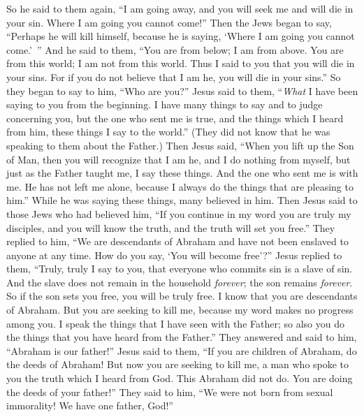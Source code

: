 \begin{biblechapter}
 So he said to them again, “I am going away, and you will seek me and will die in your sin. Where I am going you cannot come!”
\verse Then the Jews began to say, “Perhaps he will kill himself, because he is saying, ‘Where I am going you cannot come.’ ”
\verse And he said to them, “You are from below; I am from above. You are from this world; I am not from this world.
\verse Thus I said to you that you will die in your sins. For if you do not believe that I am he, you will die in your sins.”
\verse So they began to say to him, “Who are you?” Jesus said to them, “\textit{What} I have been saying to you from the beginning.
\verse I have many things to say and to judge concerning you, but the one who sent me is true, and the things which I heard from him, these things I say to the world.”
\verse (They did not know that he was speaking to them about the Father.)
\verse Then Jesus said, “When you lift up the Son of Man, then you will recognize that I am he, and I do nothing from myself, but just as the Father taught me, I say these things.
\verse And the one who sent me is with me. He has not left me alone, because I always do the things that are pleasing to him.”
\verse While he was saying these things, many believed in him.
 Then Jesus said to those Jews who had believed him, “If you continue in my word you are truly my disciples,
\verse and you will know the truth, and the truth will set you free.”
\verse They replied to him, “We are descendants of Abraham and have not been enslaved to anyone at any time. How do you say, ‘You will become free’?”
\verse Jesus replied to them, “Truly, truly I say to you, that everyone who commits sin is a slave of sin.
\verse And the slave does not remain in the household \textit{forever}; the son remains \textit{forever}.
\verse So if the son sets you free, you will be truly free.
\verse I know that you are descendants of Abraham. But you are seeking to kill me, because my word makes no progress among you.
\verse I speak the things that I have seen with the Father; so also you do the things that you have heard from the Father.”
 They answered and said to him, “Abraham is our father!” Jesus said to them, “If you are children of Abraham, do the deeds of Abraham!
\verse But now you are seeking to kill me, a man who spoke to you the truth which I heard from God. This Abraham did not do.
\verse You are doing the deeds of your father!”
\verse They said to him, “We were not born from sexual immorality! We have one father, God!”

\end{biblechapter}

